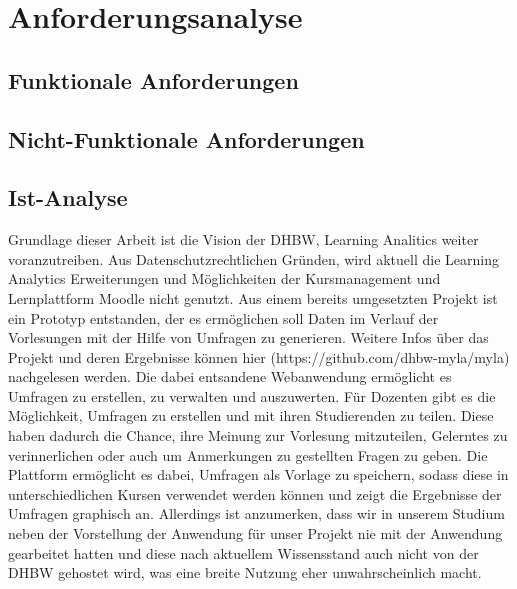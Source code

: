 \chapter{Anforderungsanalyse}
\section{Funktionale Anforderungen}


\section{Nicht-Funktionale Anforderungen}


\section{Ist-Analyse}
Grundlage dieser Arbeit ist die Vision der DHBW, Learning Analitics weiter voranzutreiben.
Aus Datenschutzrechtlichen Gründen, wird aktuell die Learning Analytics Erweiterungen und Möglichkeiten der Kursmanagement und Lernplattform Moodle nicht genutzt.
Aus einem bereits umgesetzten Projekt ist ein Prototyp entstanden, der es ermöglichen soll Daten im Verlauf der Vorlesungen mit der Hilfe von Umfragen zu generieren.
Weitere Infos über das Projekt und deren Ergebnisse können hier (https://github.com/dhbw-myla/myla) nachgelesen werden. 
Die dabei entsandene Webanwendung ermöglicht es Umfragen zu erstellen, zu verwalten und auszuwerten.
Für Dozenten gibt es die Möglichkeit, Umfragen zu erstellen und mit ihren Studierenden zu teilen.
Diese haben dadurch die Chance, ihre Meinung zur Vorlesung mitzuteilen, Gelerntes zu verinnerlichen oder auch um Anmerkungen zu gestellten Fragen zu geben.
Die Plattform ermöglicht es dabei, Umfragen als Vorlage zu speichern, sodass diese in unterschiedlichen Kursen verwendet werden können und zeigt die Ergebnisse der Umfragen graphisch an.
Allerdings ist anzumerken, dass wir in unserem Studium neben der Vorstellung der Anwendung für unser Projekt nie mit der Anwendung gearbeitet hatten und diese nach aktuellem Wissensstand auch nicht von der DHBW gehostet wird, was eine breite Nutzung eher unwahrscheinlich macht. 
